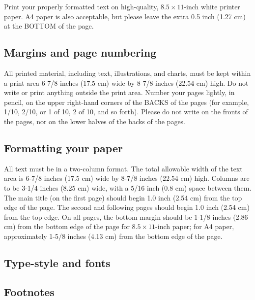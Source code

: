 \documentclass[
10pt,			%
paper=a4,		%
ngerman,		%
BCOR=0pt,		%
DIV=calc,		%
headinclude,	%
headsepline,	%
numbers=noenddot,
twocolumn,
]{article}
\begin{document}
Print your properly formatted text on high-quality, $8.5 \times 11$-inch 
white printer paper. A4 paper is also acceptable, but please leave the 
extra 0.5 inch (1.27 cm) at the BOTTOM of the page.

\subsection{Margins and page numbering}

All printed material, including text, illustrations, and charts, must be 
kept within a print area 6-7/8 inches (17.5 cm) wide by 8-7/8 inches 
(22.54 cm) high. Do not write or print anything outside the print area. 
Number your pages lightly, in pencil, on the upper right-hand corners of 
the BACKS of the pages (for example, 1/10, 2/10, or 1 of 10, 2 of 10, and 
so forth). Please do not write on the fronts of the pages, nor on the 
lower halves of the backs of the pages.


\subsection{Formatting your paper}

All text must be in a two-column format. The total allowable width of 
the text area is 6-7/8 inches (17.5 cm) wide by 8-7/8 inches (22.54 cm) 
high. Columns are to be 3-1/4 inches (8.25 cm) wide, with a 5/16 inch 
(0.8 cm) space between them. The main title (on the first page) should 
begin 1.0 inch (2.54 cm) from the top edge of the page. The second and 
following pages should begin 1.0 inch (2.54 cm) from the top edge. On 
all pages, the bottom margin should be 1-1/8 inches (2.86 cm) from the 
bottom edge of the page for $8.5 \times 11$-inch paper; for A4 paper, 
approximately 1-5/8 inches (4.13 cm) from the bottom edge of the page.

\subsection{Type-style and fonts}



\subsection{Footnotes}
\end{document}
